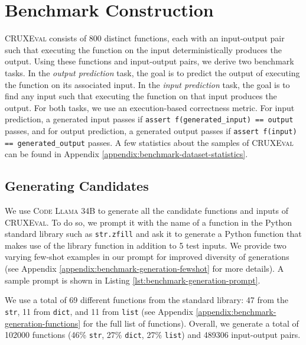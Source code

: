\documentclass{article}
\newcommand{\benchmark}{\textsc{CRUXEval}\xspace}
\newcommand{\codellamalarge}{\textsc{Code Llama 34B}\xspace}
\theoremstyle{plain}
\theoremstyle{definition}
\theoremstyle{remark}
\begin{document}

\section{Benchmark Construction} \label{sec:benchmark-construction}

\benchmark consists of 800 distinct functions, each with an input-output pair such that executing the function on the input deterministically produces the output. Using these functions and input-output pairs, we derive two benchmark tasks. In the \textit{output prediction} task, the goal is to predict the output of executing the function on its associated input. In the \textit{input prediction} task, the goal is to find any input such that executing the function on that input produces the output. For both tasks, we use an execution-based correctness metric. For input prediction, a generated input passes if \texttt{assert f(generated\_input) == output} passes, and for output prediction, a generated output passes if \texttt{assert f(input) == generated\_output} passes. A few statistics about the samples of \benchmark can be found in Appendix \ref{appendix:benchmark-dataset-statistics}.

\subsection{Generating Candidates} \label{subsec:generating-candidates}
We use \codellamalarge to generate all the candidate functions and inputs of \benchmark. To do so, we prompt it with the name of a function in the Python standard library such as \texttt{str.zfill} and ask it to generate a Python function that makes use of the library function in addition to 5 test inputs. We provide two varying few-shot examples in our prompt for improved diversity of generations (see Appendix \ref{appendix:benchmark-generation-fewshot} for more details). A sample prompt is shown in Listing \ref{lst:benchmark-generation-prompt}.

We use a total of 69 different functions from the standard library: 47 from the \texttt{str}, 11 from \texttt{dict}, and 11 from \texttt{list} (see Appendix \ref{appendix:benchmark-generation-functions} for the full list of functions). Overall, we generate a total of 102000 functions (46\% \texttt{str}, 27\% \texttt{dict}, 27\% \texttt{list}) and 489306 input-output pairs.

\end{document}

